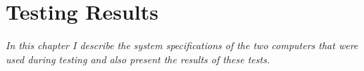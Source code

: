 \chapter{Testing Results}
\textit{In this chapter I describe the system specifications of the two computers that were used during testing and also present the results of these tests.}






